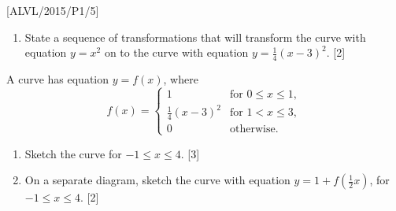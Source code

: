 \item {[}ALVL/2015/P1/5{]}
\begin{enumerate}
\item State a sequence of transformations that will transform the curve
with equation $y=x^{2}$ on to the curve with equation $y=\frac{1}{4}\left(x-3\right)^{2}$.
\hfill{}{[}2{]}
\end{enumerate}
A curve has equation $y=f\left(x\right)$, where 
\[
f\left(x\right)=\begin{cases}
1 & \text{for }0\leq x\le1,\\
\frac{1}{4}\left(x-3\right)^{2} & \text{for }1<x\leq3,\\
0 & \text{otherwise.}
\end{cases}
\]

\begin{enumerate}
\item Sketch the curve for $-1\leq x\le4$. \hfill{}{[}3{]}
\item On a separate diagram, sketch the curve with equation $y=1+f\left(\frac{1}{2}x\right)$,
for $-1\leq x\leq4$.\hfill{} {[}2{]}
\end{enumerate}
